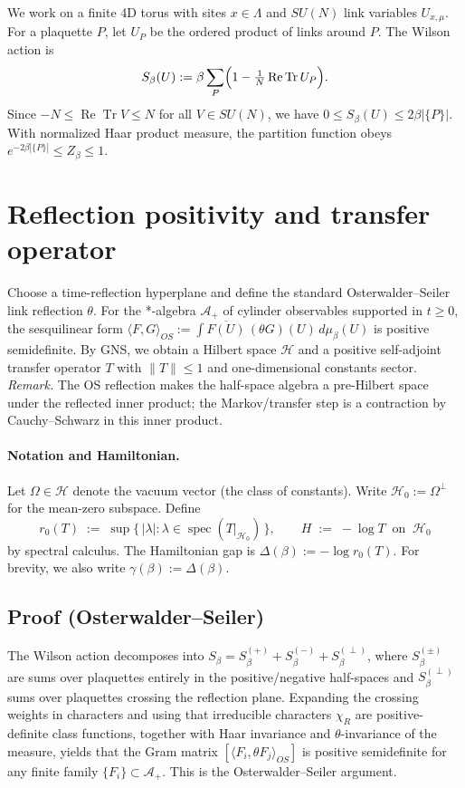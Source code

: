 \documentclass[11pt]{amsart}
\theoremstyle{plain}
\theoremstyle{definition}
\theoremstyle{remark}
\renewcommand{\tfrac}[2]{\textstyle\frac{#1}{#2}}
\begin{document}
We work on a finite 4D torus with sites $x\in\Lambda$ and $SU(N)$ link variables $U_{x,\mu}$. For a plaquette $P$, let $U_P$ be the ordered product of links around $P$. The Wilson action is
\[
 S_{\beta}(U) := \beta \sum_{P} \Bigl(1 - \tfrac{1}{N} \operatorname{Re} \operatorname{Tr} U_P\Bigr).
\]
Since $-N\le \operatorname{Re} \operatorname{Tr} V \le N$ for all $V\in SU(N)$, we have $0\le S_{\beta}(U)\le 2\beta |\{P\}|$. With normalized Haar product measure, the partition function obeys $e^{-2\beta |\{P\}|}\le Z_{\beta}\le 1$.
\section{Reflection positivity and transfer operator}

Choose a time-reflection hyperplane and define the standard Osterwalder--Seiler link reflection $\theta$. For the *-algebra $\mathcal A_+$ of cylinder observables supported in $t\ge 0$, the sesquilinear form $\langle F,G\rangle_{OS}:=\int \overline{F(U)}\,(\theta G)(U)\, d\mu_{\beta}(U)$ is positive semidefinite. By GNS, we obtain a Hilbert space $\mathcal H$ and a positive self-adjoint transfer operator $T$ with $\lVert T\rVert\le 1$ and one-dimensional constants sector.
\smallskip
\noindent\emph{Remark.} The OS reflection makes the half-space algebra a pre-Hilbert space under the reflected inner product; the Markov/transfer step is a contraction by Cauchy–Schwarz in this inner product.

\paragraph{Notation and Hamiltonian.}
Let $\Omega\in\mathcal H$ denote the vacuum vector (the class of constants). Write $\mathcal H_0:=\Omega^{\perp}$ for the mean-zero subspace. Define
\[
  r_0(T)\;:=\; \sup\{\,|\lambda| : \lambda\in\operatorname{spec}(T|_{\mathcal H_0})\,\},\qquad
  H\;:=\;-\log T\ \text{ on }\ \mathcal H_0
\]
by spectral calculus. The Hamiltonian gap is $\Delta(\beta):=-\log r_0(T)$.
For brevity, we also write $\gamma(\beta):=\Delta(\beta)$.
\subsection*{Proof (Osterwalder--Seiler)}
The Wilson action decomposes into $S_\beta=S_\beta^{(+)}+S_\beta^{(-)}+S_\beta^{(\perp)}$, where $S_\beta^{(\pm)}$ are sums over plaquettes entirely in the positive/negative half-spaces and $S_\beta^{(\perp)}$ sums over plaquettes crossing the reflection plane. Expanding the crossing weights in characters and using that irreducible characters $\chi_R$ are positive-definite class functions, together with Haar invariance and $\theta$-invariance of the measure, yields that the Gram matrix $[\langle F_i,\theta F_j\rangle_{OS}]$ is positive semidefinite for any finite family $\{F_i\}\subset \mathcal A_+$. This is the Osterwalder--Seiler argument.
\end{document}
